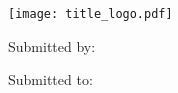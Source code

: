 \begin{titlepage}
  \centering
  \texttt{[image: title\_logo.pdf]}\\[.25cm]
  {\scshape\paperinstitution\par}
  \vspace{1cm}
  {\scshape\Large\papertype\par}
  \vspace{1.5cm}
  {\huge\bfseries\papertitle\par}
  \vspace{2cm}
  {\Large Submitted by:\par\paperauthor\par}
  \vfill
  Submitted to:\par
  {\sc\papersupervisor\par}
  \vspace{1cm}
  {\large\paperdate\par}
\end{titlepage}

